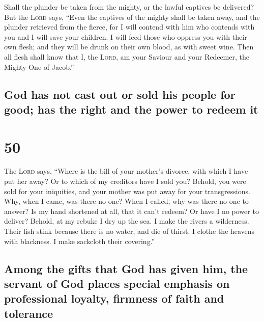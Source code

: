  Shall the plunder be taken from the mighty, or the
lawful captives be delivered?  But the \textsc{Lord}
says, ``Even the captives of the mighty shall be taken away, and the
plunder retrieved from the fierce, for I will contend with him who
contends with you and I will save your children.  I will
feed those who oppress you with their own flesh; and they will be drunk
on their own blood, as with sweet wine. Then all flesh shall know that
I, the \textsc{Lord}, am your Saviour and your Redeemer, the Mighty One
of Jacob.''

\hypertarget{god-has-not-cast-out-or-sold-his-people-for-good-has-the-right-and-the-power-to-redeem-it}{%
\subsection{God has not cast out or sold his people for good; has the
right and the power to redeem
it}\label{god-has-not-cast-out-or-sold-his-people-for-good-has-the-right-and-the-power-to-redeem-it}}

\hypertarget{section-49}{%
\section{50}\label{section-49}}

 The \textsc{Lord} says, ``Where is the bill of your
mother's divorce, with which I have put her away? Or to which of my
creditors have I sold you? Behold, you were sold for your iniquities,
and your mother was put away for your transgressions. 
Why, when I came, was there no one? When I called, why was there no one
to answer? Is my hand shortened at all, that it can't redeem? Or have I
no power to deliver? Behold, at my rebuke I dry up the sea. I make the
rivers a wilderness. Their fish stink because there is no water, and die
of thirst.  I clothe the heavens with blackness. I make
sackcloth their covering.''

\hypertarget{among-the-gifts-that-god-has-given-him-the-servant-of-god-places-special-emphasis-on-professional-loyalty-firmness-of-faith-and-tolerance}{%
\subsection{Among the gifts that God has given him, the servant of God
places special emphasis on professional loyalty, firmness of faith and
tolerance}\label{among-the-gifts-that-god-has-given-him-the-servant-of-god-places-special-emphasis-on-professional-loyalty-firmness-of-faith-and-tolerance}}

